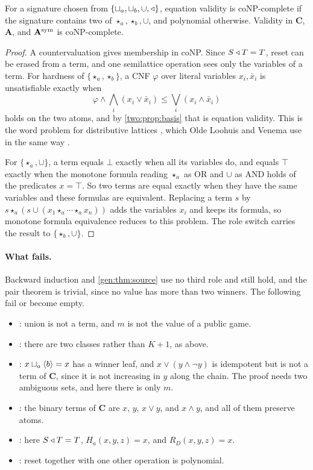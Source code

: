 \begin{proposition}[Complexity]\label{two:prop:complexity}
For a signature chosen from $\{\sqcup_a,\sqcup_b,\cup,\mathbin{\triangleleft}\}$, equation validity is coNP-complete if the signature contains two of $\star_a,\star_b,\cup$, and polynomial otherwise. Validity in $\mathbf C$, $\mathbf A$, and $\mathbf A^{\rm sym}$ is coNP-complete.
\end{proposition}
\begin{proof}
A countervaluation gives membership in coNP. Since $S\mathbin{\triangleleft} T=T$, reset can be erased from a term, and one semilattice operation sees only the variables of a term. For hardness of $\{\star_a,\star_b\}$, a CNF $\varphi$ over literal variables $x_i,\bar x_i$ is unsatisfiable exactly when
\[
 \varphi\land\bigwedge_i(x_i\lor\bar x_i)\leq\bigvee_i(x_i\land\bar x_i)
\]
holds on the two atoms, and by \cref{two:prop:basis} that is equation validity. This is the word problem for distributive lattices \cite{BloniarzHuntRosenkrantz1984}, which Olde Loohuis and Venema use in the same way \cite[Theorem~5.50]{OldeLoohuisVenema2010}.

For $\{\star_a,\cup\}$, a term equals $\bot$ exactly when all its variables do, and equals $\top$ exactly when the monotone formula reading $\star_a$ as OR and $\cup$ as AND holds of the predicates $x=\top$. So two terms are equal exactly when they have the same variables and these formulas are equivalent. Replacing a term $s$ by $s\star_a(s\cup(x_1\star_a\cdots\star_a x_n))$ adds the variables $x_i$ and keeps its formula, so monotone formula equivalence reduces to this problem. The role switch carries the result to $\{\star_b,\cup\}$.
\end{proof}

\paragraph{What fails.}
Backward induction and \cref{gen:thm:source} use no third role and still hold, and the pair theorem is trivial, since no value has more than two winners. The following fail or become empty.
\begin{itemize}
\item {}: union is not a term, and $m$ is not the value of a public game.
\item {}: there are two classes rather than $K+1$, as above.
\item {}: $x\sqcup_a\langle b\rangle=x$ has a winner leaf, and $x\lor(y\land\lnot y)$ is idempotent but is not a term of $\mathbf C$, since it is not increasing in $y$ along the chain. The proof needs two ambiguous sets, and here there is only $m$.
\item {}: the binary terms of $\mathbf C$ are $x$, $y$, $x\lor y$, and $x\land y$, and all of them preserve atoms.
\item {}: here $S\mathbin{\triangleleft} T=T$, $H_a(x,y,z)=x$, and $R_D(x,y,z)=x$.
\item {}: reset together with one other operation is polynomial.
\end{itemize}

